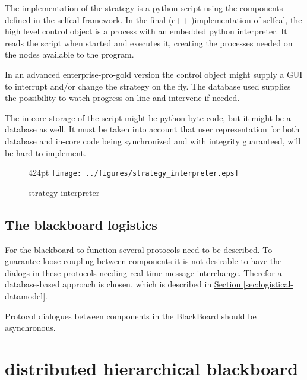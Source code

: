 \documentclass[]{lofar}
\begin{document}
      The implementation of the strategy is a python script using the
      components defined in the selfcal framework. In the final
      (c++-)implementation of selfcal, the high level control object
      is a process with an embedded python interpreter. It reads the
      script when started and executes it, creating the processes
      needed on the nodes available to the program.

      In an advanced enterprise-pro-gold version the control object
      might supply a GUI to interrupt and/or change the strategy on
      the fly. The database used supplies the possibility to watch
      progress on-line and intervene if needed.

      The in core storage of the script might be python byte code, but
      it might be a database as well. It must be taken into account
      that user representation for both database and in-core code
      being synchronized and with integrity guaranteed, will be hard
      to implement.

      \begin{figure}{424pt}
        \texttt{[image: ../figures/strategy\_interpreter.eps]}
        \hypertarget{fig:strategy_interpreter}{}
        \caption{strategy interpreter\label{fig:strategy_interpreter}}
      \end{figure}

    \subsection{The blackboard logistics}
    \label{subsec:blackboard-logistics}\hypertarget{subsec:blackboard-logistics}{}

      For the blackboard to function several protocols need to be
      described. To guarantee loose coupling between components it is
      not desirable to have the dialogs in these protocols needing
      real-time message interchange. Therefor a database-based
      approach is chosen, which is described in
      \hyperlink{sec:logistical-datamodel}{Section
      \ref{sec:logistical-datamodel}}.

      \begin{requirement}
        Protocol dialogues between components in the BlackBoard should
        be asynchronous.
        \caption{asynchronous dialogues\label{req:asynchronous}}
      \end{requirement}

  \section{distributed hierarchical blackboard}
  \label{sec:distributed-hierarchical-blackboard}\hypertarget{sec:distributed-hierarchical-blackboard}{}%
\end{document}
